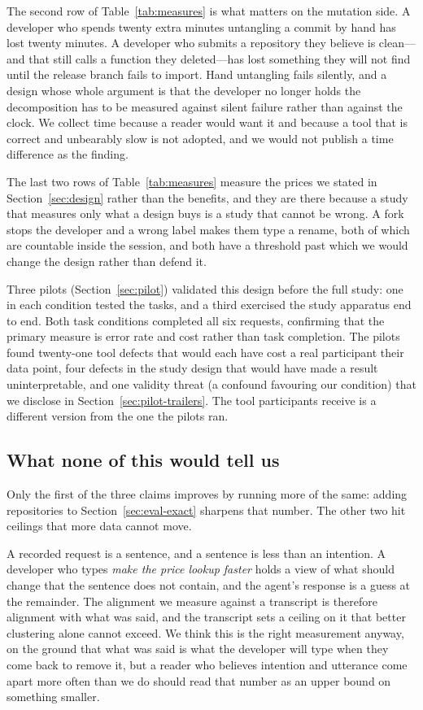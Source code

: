 \smallskip
\noindent The second row of Table~\ref{tab:measures} is what matters on the
mutation side. A developer
who spends twenty extra minutes untangling a commit by hand has lost twenty
minutes. A developer who submits a repository they believe is clean---and that
still calls a function they deleted---has lost something they will not find
until the release branch fails to import. Hand untangling fails silently, and a
design whose whole argument is that the developer no longer holds the
decomposition has to be measured against silent failure rather than against the
clock. We collect time because
a reader would want it and because a tool that is correct and unbearably slow is not
adopted, and we would not publish a time difference as the finding.

The last two rows of Table~\ref{tab:measures} measure the prices we stated in
Section~\ref{sec:design} rather than the benefits, and they are there because a
study that measures only what a design buys is a study that cannot be wrong. A
fork stops the developer and a wrong label makes them type a rename, both of which
are countable inside the session, and both have a threshold past which we would
change the design rather than defend it.

Three pilots (Section~\ref{sec:pilot}) validated this design before the
full study: one in each condition tested the tasks, and a third exercised the
study apparatus end to end. Both task conditions completed all six requests,
confirming that the primary measure is error rate and cost rather than task
completion. The pilots found twenty-one tool defects that would each have cost a
real participant their data point, four defects in the study design that would
have made a result uninterpretable, and one validity threat (a confound favouring
our condition) that we disclose in Section~\ref{sec:pilot-trailers}. The tool
participants receive is a different version from the one the pilots ran.

\subsection{What none of this would tell us}

Only the first of the three claims improves by running more of the same:
adding repositories to Section~\ref{sec:eval-exact} sharpens that number.
The other two hit ceilings that more data cannot move.

A recorded request is a sentence, and a sentence is less than an intention.
A developer who types \emph{make the price lookup faster} holds a view of what
should change that the sentence does not contain, and the agent's response is a
guess at the remainder. The alignment we measure against a transcript is therefore
alignment with what was said, and the transcript sets a ceiling on it that better
clustering alone cannot exceed.
We think this is the right measurement anyway, on the ground that what was said is
what the developer will type when they come back to remove it, but a reader who
believes intention and utterance come apart more often than we do should read that
number as an upper bound on something smaller.

